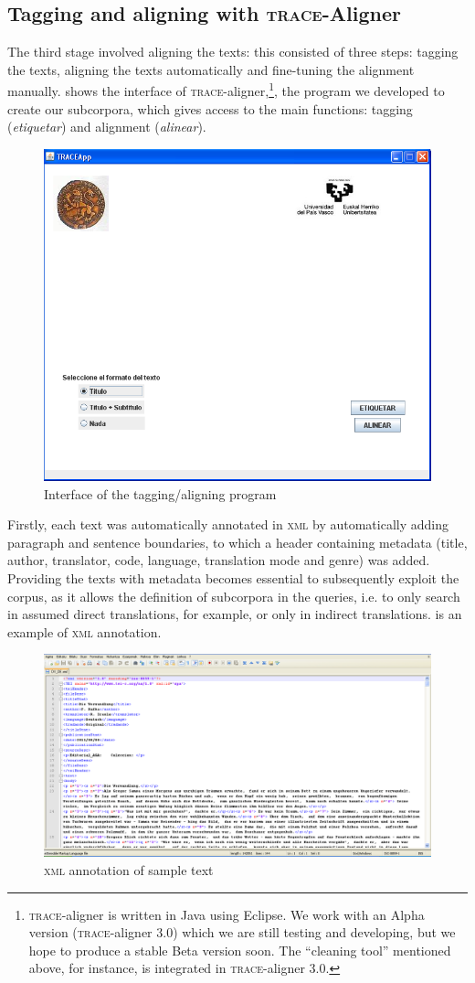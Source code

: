 \documentclass[output=paper]{LSP/langsci}
\begin{document}
\subsection{Tagging and aligning with \textsc{trace}-Aligner}

The third stage involved aligning the texts: this consisted of three steps: tagging the texts, aligning the texts automatically and fine-tuning the alignment manually.  shows the interface of \textsc{trace}-aligner,\footnote{\textsc{trace}-aligner is written in Java using Eclipse. We work with an Alpha version (\textsc{trace}-aligner 3.0) which we are still testing and developing, but we hope to produce a stable Beta version soon. The “cleaning tool” mentioned above, for instance, is integrated in \textsc{trace}-aligner 3.0.}, the program we developed to create our subcorpora, which gives access to the main functions: tagging (\textit{etiquetar}) and alignment (\textit{alinear}).  

\begin{figure} 
\includegraphics[width=.5\textwidth]{./figures/6-1.png}
\caption{Interface of the tagging/aligning program} \label{fig:3:1}
\end{figure}

Firstly, each text was automatically annotated in \textsc{xml} by automatically adding paragraph and sentence boundaries, to which a header containing metadata (title, author, translator, code, language, translation mode and genre) was added. Providing the texts with metadata becomes essential to subsequently exploit the corpus, as it allows the definition of subcorpora in the queries, i.e. to only search in assumed direct translations, for example, or only in indirect translations.  is an example of \textsc{xml} annotation.

\begin{figure}
\includegraphics[width=1.0\textwidth]{./figures/6-2.png}
\caption{\textsc{xml} annotation of sample text} \label{fig:3:2}
\end{figure}
\end{document}
